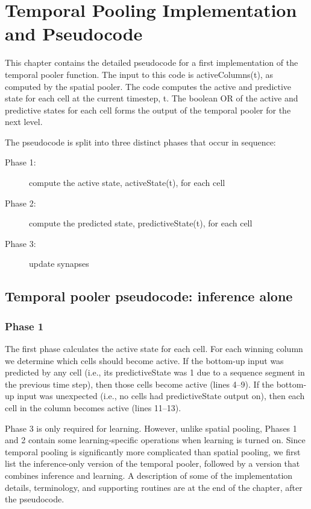 \documentclass{report}
\begin{document}
\chapter{Temporal Pooling Implementation and Pseudocode}
\label{chapter:temporal-pooling}
This chapter contains the detailed pseudocode for a first
implementation of the temporal pooler function. The input to this code
is activeColumns(t), as computed by the spatial pooler. The code
computes the active and predictive state for each cell at the current
timestep, t. The boolean OR of the active and predictive states for
each cell forms the output of the temporal pooler for the next level.

The pseudocode is split into three distinct phases that occur in sequence:
\begin{description}
\item[Phase 1:] compute the active state, activeState(t), for each cell
\item[Phase 2:] compute the predicted state, predictiveState(t), for each cell
\item[Phase 3:] update synapses
\end{description}

\section*{Temporal pooler pseudocode: inference alone}

\subsection*{Phase 1}
The first phase calculates the active state for each cell. For each
winning column we determine which cells should become active. If the
bottom-up input was predicted by any cell (i.e., its predictiveState
was 1 due to a sequence segment in the previous time step), then those
cells become active (lines 4--9). If the bottom-up input was unexpected
(i.e., no cells had predictiveState output on), then each cell in the
column becomes active (lines 11--13).

Phase 3 is only required for learning. However, unlike spatial
pooling, Phases 1 and 2 contain some learning-specific operations when
learning is turned on. Since temporal pooling is significantly more
complicated than spatial pooling, we first list the inference-only
version of the temporal pooler, followed by a version that combines
inference and learning. A description of some of the implementation
details, terminology, and supporting routines are at the end of the
chapter, after the pseudocode.
\end{document}
